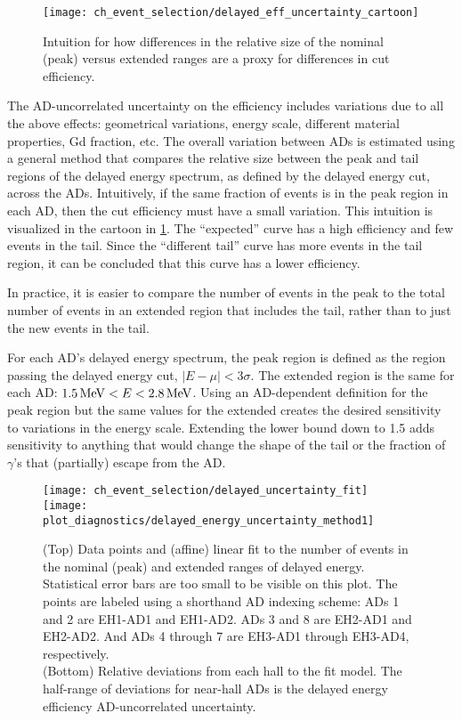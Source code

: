 \begin{figure}
    \centering
    \texttt{[image: ch\_event\_selection/delayed\_eff\_uncertainty\_cartoon]}
    \caption{
        Intuition for how differences in the relative size
        of the nominal (peak) versus extended ranges
        are a proxy for differences in cut efficiency.
    }
    \label{fig:delayed_eff_unc_cartoon}
\end{figure}

The AD-uncorrelated uncertainty on the efficiency
includes variations due to all the above effects:
geometrical variations, energy scale, different material properties,
Gd fraction, etc.
The overall variation between ADs is estimated using a general method
that compares the relative size between the peak and tail regions
of the delayed energy spectrum, as defined by the delayed energy cut,
across the ADs.
Intuitively, if the same fraction of events is in the peak region in each AD,
then the cut efficiency must have a small variation.
This intuition is visualized in the cartoon in \cref{fig:delayed_eff_unc_cartoon}.
The ``expected'' curve has a high efficiency
and few events in the tail.
Since the ``different tail'' curve has more events in the tail region,
it can be concluded that this curve has a lower efficiency.

In practice, it is easier to compare the number of events in the peak
to the total number of events in an extended region that includes the tail,
rather than to just the new events in the tail.

For each AD's delayed energy spectrum, the peak region is defined as
the region passing the delayed energy cut, $\vert E-\mu \vert < 3\sigma$.
The extended region is the same for each AD:
$\SI{1.5}{\mega\electronvolt} < E < \SI{2.8}{\mega\electronvolt}$.
Using an AD-dependent definition for the peak region but
the same values for the extended creates
the desired sensitivity to variations in the energy scale.
Extending the lower bound down to \SI{1.5}{\mev} adds sensitivity to
anything that would change the shape of the tail
or the fraction of $\gamma$'s that (partially) escape from the AD.

\begin{figure}
    \centering
    \texttt{[image: ch\_event\_selection/delayed\_uncertainty\_fit]}\\
    \texttt{[image: plot\_diagnostics/delayed\_energy\_uncertainty\_method1]}
    \caption{
        (Top) Data points and (affine) linear fit
        to the number of events in the nominal (peak)
        and extended ranges of delayed energy.
        Statistical error bars are too small to be visible on this plot.
        The points are labeled using a shorthand AD indexing scheme:
        ADs 1 and 2 are EH1-AD1 and EH1-AD2. ADs 3 and 8 are EH2-AD1 and EH2-AD2.
        And ADs 4 through 7 are EH3-AD1 through EH3-AD4, respectively.\\
        (Bottom) Relative deviations from each hall to the fit model.
        The half-range of deviations for near-hall ADs
        is the delayed energy efficiency AD-uncorrelated uncertainty.
    }
    \label{fig:delayed_eff_unc_fit}
\end{figure}


